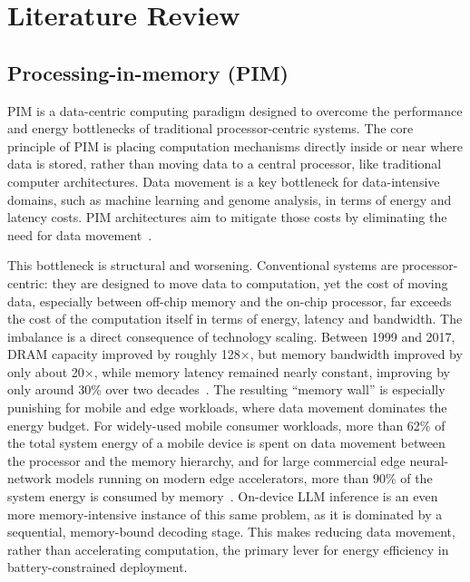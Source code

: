 \documentclass[11pt]{article}
\begin{document}
\newpage
\section{Literature Review}

\subsection{Processing-in-memory (PIM)}
PIM is a data-centric computing paradigm designed to overcome the performance and energy bottlenecks of traditional processor-centric systems. The core principle of PIM is placing computation mechanisms directly inside or near where data is stored, rather than moving data to a central processor, like traditional computer architectures. Data movement is a key bottleneck for data-intensive domains, such as machine learning and genome analysis, in terms of energy and latency costs. PIM architectures aim to mitigate those costs by eliminating the need for data movement~\cite{mutlu2022primer}.

This bottleneck is structural and worsening. Conventional systems are processor-centric: they are designed to move data to computation, yet the cost of moving data, especially between off-chip memory and the on-chip processor, far exceeds the cost of the computation itself in terms of energy, latency and bandwidth. The imbalance is a direct consequence of technology scaling. Between 1999 and 2017, DRAM capacity improved by roughly 128×, but memory bandwidth improved by only about 20×, while memory latency remained nearly constant, improving by only around 30\% over two decades~\cite{mutlu2022primer}. The resulting ``memory wall'' is especially punishing for mobile and edge workloads, where data movement dominates the energy budget. For widely-used mobile consumer workloads, more than 62\% of the total system energy of a mobile device is spent on data movement between the processor and the memory hierarchy, and for large commercial edge neural-network models running on modern edge accelerators, more than 90\% of the system energy is consumed by memory~\cite{mutlu2022primer}. On-device LLM inference is an even more memory-intensive instance of this same problem, as it is dominated by a sequential, memory-bound decoding stage. This makes reducing data movement, rather than accelerating computation, the primary lever for energy efficiency in battery-constrained deployment.
\end{document}
